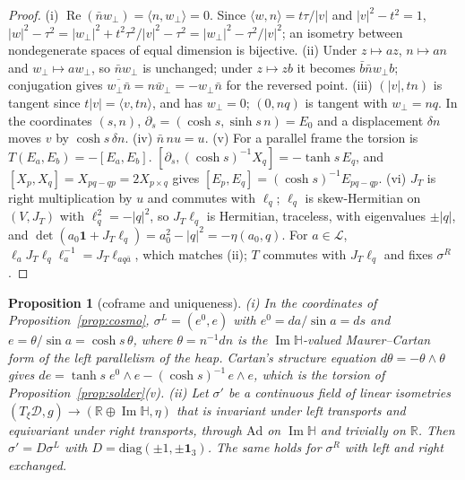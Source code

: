 \documentclass[aps,pra,onecolumn,superscriptaddress,nofootinbib,10pt]{revtex4-2}
\newtheorem{proposition}[theorem]{Proposition}
\theoremstyle{definition}
\theoremstyle{remark}
\newcommand{\R}{\mathbb{R}}
\newcommand{\HH}{\mathbb{H}}
\newcommand{\cL}{\mathcal{L}}
\newcommand{\cD}{\mathcal{D}}
\newcommand{\re}{\operatorname{Re}}
\newcommand{\im}{\operatorname{Im}}
\newcommand{\ip}[2]{\langle #1,#2\rangle}
\begin{document}
\begin{proof}
(i) $\re(\bar nw_\perp)=\ip{n}{w_\perp}=0$.  Since $\ip{w}{n}=t\tau/\lvert v\rvert$ and
$\lvert v\rvert^2-t^2=1$, $\lvert w\rvert^2-\tau^2=\lvert w_\perp\rvert^2+t^2\tau^2/\lvert v\rvert^2-\tau^2
=\lvert w_\perp\rvert^2-\tau^2/\lvert v\rvert^2$; an isometry between nondegenerate spaces of equal dimension
is bijective.  (ii) Under $z\mapsto az$, $n\mapsto an$ and $w_\perp\mapsto aw_\perp$, so $\bar nw_\perp$ is
unchanged; under $z\mapsto zb$ it becomes $\bar b\bar nw_\perp b$; conjugation gives
$\overline{w_\perp\bar n}=n\bar w_\perp=-w_\perp\bar n$ for the reversed point.  (iii) $(\lvert v\rvert,tn)$ is
tangent since $t\lvert v\rvert=\ip{v}{tn}$, and has $w_\perp=0$; $(0,nq)$ is tangent with $w_\perp=nq$.
In the coordinates $(s,n)$, $\partial_s=(\cosh s,\sinh s\,n)=E_0$ and a displacement $\delta n$ moves $v$ by
$\cosh s\,\delta n$.  (iv) $\bar n\,nu=u$.  (v) For a parallel frame the torsion is $T(E_a,E_b)=-[E_a,E_b]$.
$[\partial_s,(\cosh s)^{-1}X_q]=-\tanh s\,E_q$, and $[X_p,X_q]=X_{pq-qp}=2X_{p\times q}$ gives
$[E_p,E_q]=(\cosh s)^{-1}E_{pq-qp}$.  (vi) $J_T$ is right multiplication by $u$ and commutes with
$\ell_q$; $\ell_q$ is skew-Hermitian on $(V,J_T)$ with $\ell_q^2=-\lvert q\rvert^2$, so $J_T\ell_q$ is Hermitian,
traceless, with eigenvalues $\pm\lvert q\rvert$, and $\det(a_0\mathbf1+J_T\ell_q)=a_0^2-\lvert q\rvert^2=-\eta(a_0,q)$.
For $a\in\cL$, $\ell_aJ_T\ell_q\ell_a^{-1}=J_T\ell_{aq\bar a}$, which matches (ii); $T$ commutes with
$J_T\ell_q$ and fixes $\sigma^R$.
\end{proof}
\begin{proposition}[coframe and uniqueness]\label{prop:solderunique}
(i) In the coordinates of Proposition~\ref{prop:cosmo}, $\sigma^L=(e^0,e)$ with $e^0=da/\sin a=ds$ and
$e=\theta/\sin a=\cosh s\,\theta$, where $\theta=n^{-1}dn$ is the $\im\HH$-valued Maurer--Cartan form of the
left parallelism of the heap.  Cartan's structure equation $d\theta=-\theta\wedge\theta$ gives
$de=\tanh s\;e^0\wedge e-(\cosh s)^{-1}\,e\wedge e$, which is the torsion of
Proposition~\ref{prop:solder}(v).
(ii) Let $\sigma'$ be a continuous field of linear isometries $(T_\xi\cD,g)\to(\R\oplus\im\HH,\eta)$ that
is invariant under left transports and equivariant under right transports, through $\mathrm{Ad}$ on
$\im\HH$ and trivially on $\R$.  Then $\sigma'=D\sigma^L$ with $D=\mathrm{diag}(\pm1,\pm\mathbf1_3)$.  The
same holds for $\sigma^R$ with left and right exchanged.
\end{proposition}
\end{document}

